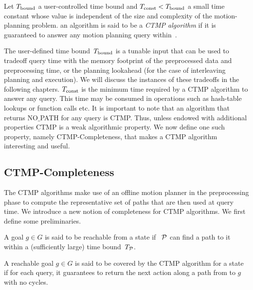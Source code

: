 \documentclass[a4paper]{report}
\begin{document}
\begin{definition}
\label{ctmp:def}
Let $T_{\textrm{bound}}$ a user-controlled time bound
and
$T_{\textrm{const}} < T_{\textrm{bound}}$ a small time constant whose value is independent of the size and complexity of the motion-planning problem.
%
an algorithm is said to be a \emph{CTMP algorithm} if it is guaranteed to answer any motion planning query within~\Tbound.
\end{definition}

The user-defined time bound~$T_{\textrm{bound}}$ is a tunable input that can be used to tradeoff query time with the memory footprint of the preprocessed data and preprocessing time, or the planning lookahead (for the case of interleaving planning and execution). We will discuss the instances of these tradeoffs in the following chapters.
%
$T_{\textrm{const}}$ is the minimum time required by a CTMP algorithm to answer any query. This time may be consumed in operations such as hash-table lookups or function calls etc.
%
It is important to note that an algorithm that returns NO$\_$PATH for any query is CTMP. Thus, unless endowed with additional properties CTMP is a weak algorithmic property.
We now define one such property, namely CTMP-Completeness, that makes a CTMP algorithm interesting and useful.

\subsection{CTMP-Completeness}
The CTMP algorithms make use of an offline motion planner \calP in the preprocessing phase to compute the representative set of paths that are then used at query time. We introduce a new notion of completeness for CTMP algorithms. We first define some preliminaries.
\vspace{2mm}
\begin{definition}[Reachability]
\label{def:reachable}
A goal $g \in G$ is said to be reachable from a state \Sstart if~$~\mathcal{P}$ can find a path to it within a (sufficiently large) time bound~$T_\textrm{\ensuremath{\mathcal{P}}}$. 
\end{definition}

\vspace{2mm}
\begin{definition}[Coverage]
\label{def:covered}
    A reachable goal $g \in G$ is said to be covered by the CTMP algorithm for a state \Sstart if for each query, it guarantees to return the next action along a path from \Sstart to $g$ with no cycles.
\end{definition}
\end{document}
